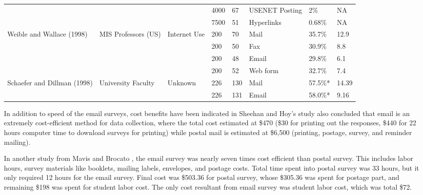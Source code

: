 \begin{center}
\begin{longtable}{ | p{2cm} | p{2cm} | p{2cm} | p{0.75cm} | p{0.75cm} | p{1cm} | p{1cm} | p{0.5cm} | }
	&  &  & 4000 & 67 & USENET Posting & 2\% & NA \\ \cline{4-8}
	&  &  & 7500 & 51 & Hyperlinks & 0.68\% & NA \\ \hline 
    \multirow{4}{2cm}{Weible and Wallace (1998)} & \multirow{4}{2cm}{MIS Professors (US)} & \multirow{4}{2cm}{Internet Use} & 200 & 70 & Mail & 35.7\% & 12.9 \\ \cline{4-8}
	&  &  & 200 & 50 & Fax & 30.9\% & 8.8 \\ \cline{4-8}
	&  &  & 200 & 48 & Email & 29.8\% & 6.1 \\ \cline{4-8}
	&  &  & 200 & 52 & Web form & 32.7\% & 7.4 \\ \hline
    \multirow{2}{2cm}{Schaefer and Dillman (1998)} & \multirow{2}{2cm}{University Faculty} & \multirow{2}{2cm}{Unknown} & 226 & 130 & Mail & 57.5\%* & 14.39 \\ \cline{4-8}
	&  &  & 226 & 131 & Email & 58.0\%* & 9.16 \\ \hline
    \end{longtable}
\end{center}


In addition to speed of the email surveys, cost benefits have been indicated in Sheehan and Hoy's study \cite{Sheehan2006} also concluded that email is an extremely cost-efficient method for data collection, where the total cost estimated at \$470 (\$30 for printing out the responses, \$440 for 22 hours computer time to download surveys for printing) while postal mail is estimated at \$6,500 (printing, postage, survey, and reminder mailing).
\vspace{1cm}

In another study from Mavis and Brocato \cite{Mavis1998}, the email survey was nearly seven times cost efficient than postal survey. This includes labor hours, survey materials like booklets, mailing labels, envelopes, and postage costs. Total time spent into postal survey was 33 hours, but it only required 12 hours for the email survey. Final cost was \$503.36 for postal survey, whose \$305.36 was spent for postage part, and remaining \$198 was spent for student labor cost. The only cost resultant from email survey was student labor cost, which was total \$72.
\vspace{1cm}


